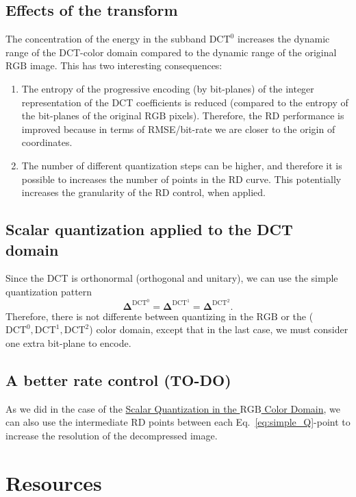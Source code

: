 \subsection{Effects of the transform}
The concentration of the energy in the subband $\text{DCT}^0$
increases the dynamic range of the DCT-color domain compared to the
dynamic range of the original $\text{RGB}$ image. This has two
interesting consequences:
\begin{enumerate}
\item The entropy of the progressive encoding (by bit-planes) of the
  integer representation of the DCT coefficients is reduced (compared
  to the entropy of the bit-planes of the original $\text{RGB}$
  pixels). Therefore, the RD performance is improved because in terms
  of RMSE/bit-rate we are closer to the origin of coordinates.
\item The number of different quantization steps can be higher, and
  therefore it is possible to increases the number of points in the RD
  curve. This potentially increases the granularity of the RD control,
  when applied.
\end{enumerate}

\subsection{Scalar quantization applied to the DCT domain}
Since the DCT is orthonormal (orthogonal and unitary), we can use the
simple quantization pattern
\begin{equation}
  \mathbf{\Delta}^{\text{DCT}^0} = \mathbf{\Delta}^{\text{DCT}^1} = \mathbf{\Delta}^{\text{DCT}^2}.
  \label{eq:simple_Q}
\end{equation}
Therefore, there is not differente between quantizing in the
$\text{RGB}$ or the ($\text{DCT}^0,\text{DCT}^1,\text{DCT}^2$) color
domain, except that in the last case, we must consider one extra
bit-plane to encode.

\subsection{A better rate control (TO-DO)}
\label{sec:increasing}
As we did in the case of the
\href{https://sistemas-multimedia.github.io/contents/RGB_SQ/}{Scalar
  Quantization in the $\text{RGB}$ Color Domain}, we can also use the
intermediate RD points between each Eq.~\eqref{eq:simple_Q}-point to
increase the resolution of the decompressed image.


\section{Resources}

